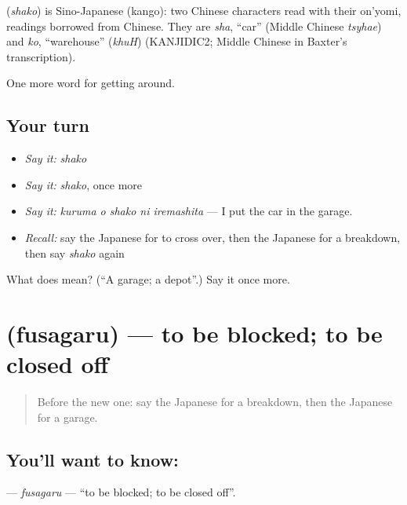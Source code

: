 \begin{cousinweb}
\textbf{} (\emph{shako}) is Sino-Japanese (kango): two Chinese characters read with their on'yomi, readings borrowed from Chinese. They are \emph{sha}, \textquotedblleft{}car\textquotedblright{} (Middle Chinese \emph{tsyhae}) and \emph{ko}, \textquotedblleft{}warehouse\textquotedblright{} (\emph{khuH}) (KANJIDIC2; Middle Chinese in Baxter's transcription).
\end{cousinweb}

\begin{grammarlens}[title={What you've built}]
One more word for getting around.
\end{grammarlens}

\subsection*{Your turn}
\begin{itemize}
\raggedright
  \item \emph{Say it:} \emph{shako}
  \item \emph{Say it:} \emph{shako}, once more
  \item \emph{Say it:} \emph{kuruma o shako ni iremashita} — I put the car in the garage.
  \item \emph{Recall:} say the Japanese for to cross over, then the Japanese for a breakdown, then say \emph{shako} again
\end{itemize}

\begin{tcolorbox}[breakable,colback=teal!4,colframe=teal!35!black,title={Before you move on}]
What does  mean? (\textquotedblleft{}A garage; a depot\textquotedblright{}.) Say it once more.
\end{tcolorbox}
\section[\texorpdfstring{\ja{ふさがる} (fusagaru)}{ふさがる (fusagaru)}]{ (fusagaru) — to be blocked; to be closed off}

\label{lesson:JA-C395-fusagaru}



\begin{quote}
Before the new one: say the Japanese for a breakdown, then the Japanese for a garage.
\end{quote}

\subsection*{You'll want to know: }
\textbf{} — \emph{fusagaru} — \textquotedblleft{}to be blocked; to be closed off\textquotedblright{}.

